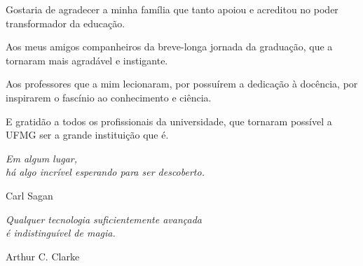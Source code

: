 \begin{agradecimentos}

Gostaria de agradecer a minha família que tanto apoiou e acreditou no poder transformador da educação.

Aos meus amigos companheiros da breve-longa jornada da graduação, que a tornaram mais agradável e instigante.

Aos professores que a mim lecionaram, por possuírem a dedicação à docência, por inspirarem o fascínio ao conhecimento e ciência.

E gratidão a todos os profissionais da universidade, que tornaram possível a UFMG ser a grande instituição que é.



\end{agradecimentos}

\begin{epigrafe}
    \vspace*{\fill}
	\begin{flushright}
		\textit{Em algum lugar, \\ há algo incrível esperando para ser descoberto.}
        
        Carl Sagan

		\textit{Qualquer tecnologia suficientemente avançada \\
		é indistinguível de magia.}
        
        Arthur C. Clarke
	\end{flushright}
\end{epigrafe}
